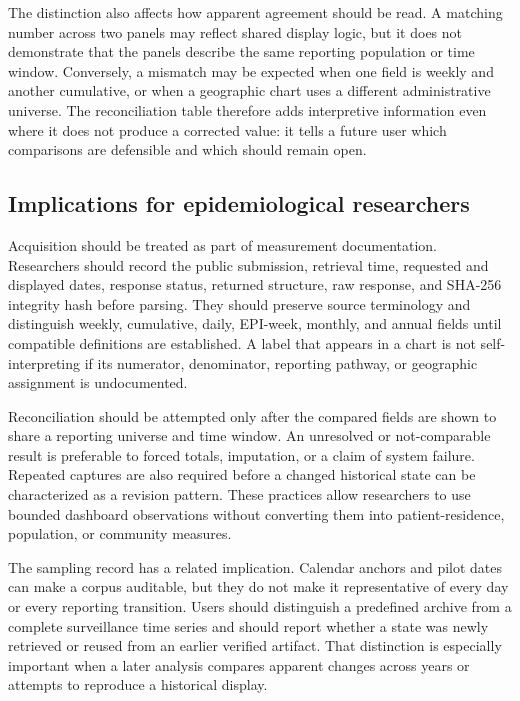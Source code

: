 The distinction also affects how apparent agreement should be read. A matching number across two panels may reflect shared display logic, but it does not demonstrate that the panels describe the same reporting population or time window. Conversely, a mismatch may be expected when one field is weekly and another cumulative, or when a geographic chart uses a different administrative universe. The reconciliation table therefore adds interpretive information even where it does not produce a corrected value: it tells a future user which comparisons are defensible and which should remain open.

\subsection{Implications for epidemiological researchers}

Acquisition should be treated as part of measurement documentation. Researchers should record the public submission, retrieval time, requested and displayed dates, response status, returned structure, raw response, and SHA-256 integrity hash before parsing. They should preserve source terminology and distinguish weekly, cumulative, daily, EPI-week, monthly, and annual fields until compatible definitions are established. A label that appears in a chart is not self-interpreting if its numerator, denominator, reporting pathway, or geographic assignment is undocumented.

Reconciliation should be attempted only after the compared fields are shown to share a reporting universe and time window. An unresolved or not-comparable result is preferable to forced totals, imputation, or a claim of system failure. Repeated captures are also required before a changed historical state can be characterized as a revision pattern. These practices allow researchers to use bounded dashboard observations without converting them into patient-residence, population, or community measures.

The sampling record has a related implication. Calendar anchors and pilot dates can make a corpus auditable, but they do not make it representative of every day or every reporting transition. Users should distinguish a predefined archive from a complete surveillance time series and should report whether a state was newly retrieved or reused from an earlier verified artifact. That distinction is especially important when a later analysis compares apparent changes across years or attempts to reproduce a historical display.

